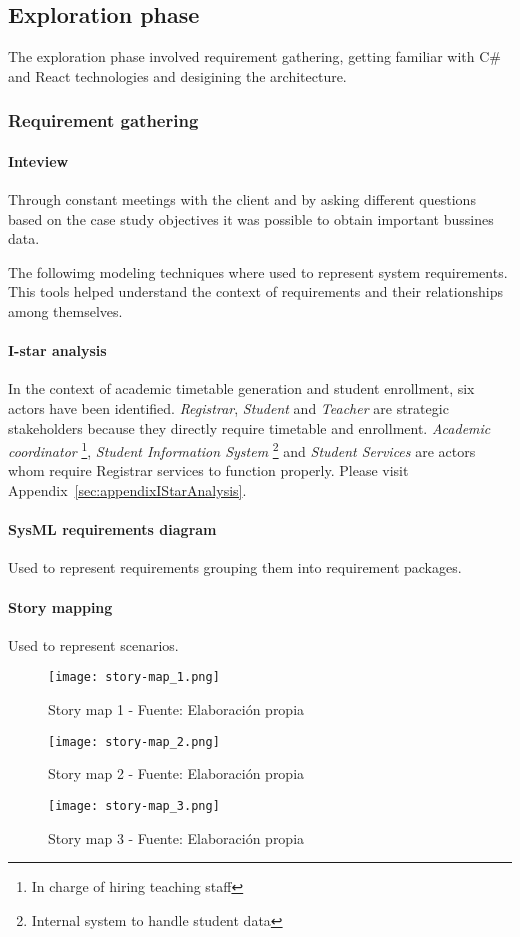 \subsection{Exploration phase}
The exploration phase involved requirement gathering, getting familiar with C\# and React technologies and desigining the architecture.

\subsubsection{Requirement gathering}
\paragraph{Inteview} Through constant meetings with the client and by asking different questions based on the case study objectives it was possible to obtain important bussines data.


The followimg modeling techniques where used to represent system requirements. This tools helped understand the context of requirements and their relationships among themselves.
\paragraph{I-star analysis} 
In the context of academic timetable generation and student enrollment, six actors have been identified.
\textit{Registrar}, \textit{Student} and \textit{Teacher} are strategic stakeholders because they directly require timetable and enrollment.
\textit{Academic coordinator} \footnote{In charge of hiring teaching staff}, \textit{Student Information System} \footnote{Internal system to handle student data} and \textit{Student Services} are actors whom require Registrar services to function properly.
Please visit Appendix~\ref{sec:appendixIStarAnalysis}.

\paragraph{SysML requirements diagram} Used to represent requirements grouping them into requirement packages.
\paragraph{Story mapping} Used to represent scenarios.
\begin{figure}[H]
    \centering
    \texttt{[image: story-map\_1.png]}
    \caption{Story map 1 - Fuente: Elaboración propia}
    \label{fig:story_map_1}
\end{figure}
\begin{figure}[H]
    \centering
    \texttt{[image: story-map\_2.png]}
    \caption{Story map 2 - Fuente: Elaboración propia}
    \label{fig:story_map_2}
\end{figure}
\begin{figure}[H]
    \centering
    \texttt{[image: story-map\_3.png]}
    \caption{Story map 3 - Fuente: Elaboración propia}
    \label{fig:story_map_3}
\end{figure}

